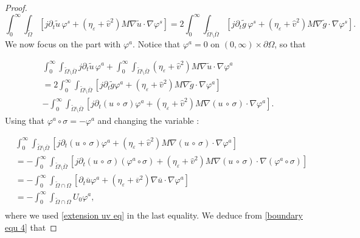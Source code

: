 \documentclass[reqno,12pt,twoside]{amsart}
\numberwithin{equation}{section} \numberwithin{theorem}{section}
\numberwithin{proposition}{section} \numberwithin{lemma}{section}
\numberwithin{corollary}{section}
\numberwithin{definition}{section} \numberwithin{remark}{section}
\begin{document}
\begin{proof}
\begin{equation}\label{boundary equ 3}
\int_0^\infty \int_{\widetilde{\Omega}}\left[ j \partial_t \widetilde{u} \,\varphi^s + (\eta_\varepsilon + \hat{v}^2) M \nabla \widetilde{u} \cdot \nabla \varphi^s\right] =  2\int_0^\infty \int_{\widetilde{\Omega}\setminus \overline{\Omega}}\left[ j\partial_t \widetilde{g} \,\varphi^s +(\eta_\varepsilon + \hat{v}^2)M\nabla \widetilde{g} \cdot \nabla \varphi ^s\right].
\end{equation}
We now focus on the part with $\varphi^a$. Notice that $\varphi^a =0$ on $(0,\infty) \times \partial\Omega$, so that  

\begin{multline}\label{boundary equ 4}
\int_0^\infty\int_{\widetilde{\Omega}\setminus \overline{\Omega}} j \partial_t \widetilde{u}\, \varphi^a  + \int_0^\infty\int_{\widetilde{\Omega}\setminus \overline{\Omega}} (\eta_\varepsilon + \hat{v}^2 ) M\nabla \widetilde{u} \cdot \nabla \varphi^a \\
= 2\int_0^\infty \int_{\widetilde{\Omega}\setminus \overline{\Omega}} \left[ j\partial_t \widetilde{g} \varphi^a +(\eta_\varepsilon + \hat{v}^2)M\nabla \widetilde{g} \cdot \nabla \varphi ^a \right]\\
 - \int_0^\infty\int_{\widetilde{\Omega}\setminus \overline{\Omega}} \left[ j\partial_t (u\, \circ \,\sigma) \varphi^a + (\eta_\varepsilon + \hat{v}^2)M\nabla (u\, \circ \,\sigma) \cdot \nabla \varphi ^a \right].
\end{multline}
Using that $\varphi^a \circ \sigma = -\varphi^a$ and changing the variable : 

\begin{align*}
&\int_0^\infty\int_{\widetilde{\Omega}\setminus \overline{\Omega}} \left[j\partial_t (u\, \circ \,\sigma) \varphi^a + (\eta_\varepsilon + \hat{v}^2)M\nabla (u\, \circ \,\sigma) \cdot \nabla \varphi ^a\right]\\
&= -\int_0^\infty\int_{\widetilde{\Omega}\setminus \overline{\Omega}}\left[ j\partial_t (u\, \circ \,\sigma) (\varphi^a \circ \sigma) + (\eta_\varepsilon + \hat{v}^2)M\nabla (u\, \circ \,\sigma) \cdot \nabla (\varphi ^a \circ \sigma)\right]\\
&= -\int_0^\infty\int_{\widetilde{\Omega}\cap \Omega}\left[ \partial_t \overline{u} \varphi^a + (\eta_\varepsilon + \overline{v}^2) \nabla \overline{u} \cdot \nabla \varphi^a\right] \\
&=-\int_0^\infty\int_{\widetilde{\Omega}\cap \Omega} U_0 \varphi^a,\\
\end{align*}
where we used \eqref{extension uv eq} in the last equality. 
We deduce from \eqref{boundary equ 4} that 


\end{proof}
\end{document}
